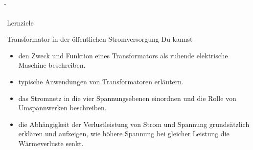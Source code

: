 \v{
	\begin{frame}{Lernziele}
		\begin{Lernziele}{Transformator in der öffentlichen Stromversorgung}
			Du kannst
			\begin{itemize}
				\item den Zweck und Funktion eines Transformators als ruhende elektrische Maschine beschreiben.
				\item typische Anwendungen von Transformatoren erläutern.
				\item das Stromnetz in die vier Spannungsebenen einordnen und die Rolle von Umspannwerken beschreiben.
				\item die Abhängigkeit der Verlustleistung von Strom und Spannung grundsätzlich erklären und aufzeigen, wie höhere Spannung bei gleicher Leistung die Wärmeverluste senkt.
			\end{itemize}
		\end{Lernziele}
	\end{frame}
}

